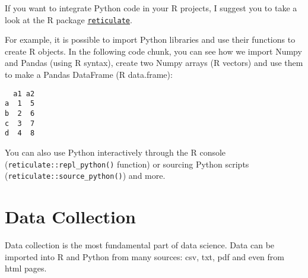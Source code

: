 \documentclass[
  letterpaper,
  DIV=11,
  numbers=noendperiod]{scrreprt}
\newenvironment{Shaded}{\begin{snugshade}}{\end{snugshade}}
\newcommand{\AttributeTok}[1]{\textcolor[rgb]{0.40,0.46,0.14}{#1}}
\newcommand{\DecValTok}[1]{\textcolor[rgb]{0.68,0.00,0.00}{#1}}
\newcommand{\FunctionTok}[1]{\textcolor[rgb]{0.28,0.35,0.67}{#1}}
\newcommand{\NormalTok}[1]{\textcolor[rgb]{0.00,0.46,0.62}{#1}}
\newcommand{\OtherTok}[1]{\textcolor[rgb]{0.00,0.46,0.62}{#1}}
\newcommand{\SpecialCharTok}[1]{\textcolor[rgb]{0.37,0.37,0.37}{#1}}
\newcommand{\StringTok}[1]{\textcolor[rgb]{0.13,0.47,0.30}{#1}}
\begin{document}
If you want to integrate Python code in your R projects, I suggest you
to take a look at the R package
\href{https://rstudio.github.io/reticulate/}{\texttt{reticulate}}.

For example, it is possible to import Python libraries and use their
functions to create R objects. In the following code chunk, you can see
how we import Numpy and Pandas (using R syntax), create two Numpy arrays
(R vectors) and use them to make a Pandas DataFrame (R data.frame):

\begin{Shaded}
\end{Shaded}

\begin{verbatim}
  a1 a2
a  1  5
b  2  6
c  3  7
d  4  8
\end{verbatim}

You can also use Python interactively through the R console
(\texttt{reticulate::repl\_python()} function) or sourcing Python
scripts (\texttt{reticulate::source\_python()}) and more.

\part{Data Collection}

Data collection is the most fundamental part of data science. Data can
be imported into R and Python from many sources: csv, txt, pdf and even
from html pages.
\end{document}
